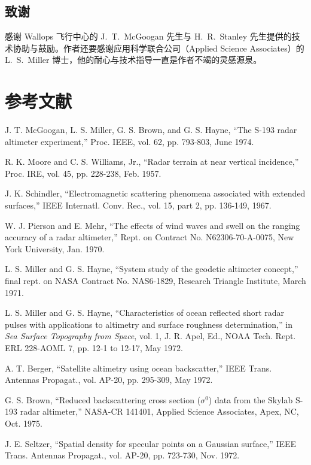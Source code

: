 \subsection*{致谢}
\seccontent
感谢 Wallops 飞行中心的 J.~T.~McGoogan 先生与 H.~R.~Stanley 先生提供的技术协助与鼓励。作者还要感谢应用科学联合公司（Applied Science Associates）的 L.~S.~Miller 博士，他的耐心与技术指导一直是作者不竭的灵感源泉。

\clearpage
\section*{参考文献}

{\wuhao
\setlength{\parindent}{0pt}
\noindent[1] J. T. McGoogan, L. S. Miller, G. S. Brown, and G. S. Hayne, ``The S-193 radar altimeter experiment,'' Proc. IEEE, vol. 62, pp. 793-803, June 1974.\par
\noindent[2] R. K. Moore and C. S. Williams, Jr., ``Radar terrain at near vertical incidence,'' Proc. IRE, vol. 45, pp. 228-238, Feb. 1957.\par
\noindent[3] J. K. Schindler, ``Electromagnetic scattering phenomena associated with extended surfaces,'' IEEE Internatl. Conv. Rec., vol. 15, part 2, pp. 136-149, 1967.\par
\noindent[4] W. J. Pierson and E. Mehr, ``The effects of wind waves and swell on the ranging accuracy of a radar altimeter,'' Rept. on Contract No. N62306-70-A-0075, New York University, Jan. 1970.\par
\noindent[5] L. S. Miller and G. S. Hayne, ``System study of the geodetic altimeter concept,'' final rept. on NASA Contract No. NAS6-1829, Research Triangle Institute, March 1971.\par
\noindent[6] L. S. Miller and G. S. Hayne, ``Characteristics of ocean reflected short radar pulses with applications to altimetry and surface roughness determination,'' in \emph{Sea Surface Topography from Space}, vol. 1, J. R. Apel, Ed., NOAA Tech. Rept. ERL 228-AOML 7, pp. 12-1 to 12-17, May 1972.\par
\noindent[7] A. T. Berger, ``Satellite altimetry using ocean backscatter,'' IEEE Trans. Antennas Propagat., vol. AP-20, pp. 295-309, May 1972.\par
\noindent[8] G. S. Brown, ``Reduced backscattering cross section ($\sigma^{0}$) data from the Skylab S-193 radar altimeter,'' NASA-CR 141401, Applied Science Associates, Apex, NC, Oct. 1975.\par
\noindent[9] J. E. Seltzer, ``Spatial density for specular points on a Gaussian surface,'' IEEE Trans. Antennas Propagat., vol. AP-20, pp. 723-730, Nov. 1972.\par
}
